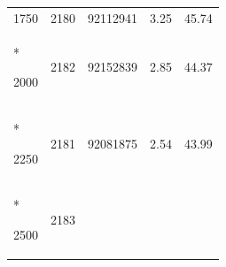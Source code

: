 \documentclass[
  12pt,
  oneside,
  openany]{book}
\begin{document}
\begin{appendices}
\begin{singlespace}
\begin{longtable}[]{@{}lllll@{}}
\begin{minipage}[t]{0.16\columnwidth}
1750\strut
\end{minipage} & \begin{minipage}[t]{0.09\columnwidth}\raggedright
2180\strut
\end{minipage} & \begin{minipage}[t]{0.18\columnwidth}\raggedright
92112941\strut
\end{minipage} & \begin{minipage}[t]{0.24\columnwidth}\raggedright
3.25\strut
\end{minipage} & \begin{minipage}[t]{0.18\columnwidth}\raggedright
45.74\strut
\end{minipage}\tabularnewline*
\begin{minipage}[t]{0.16\columnwidth}\raggedright
2000\strut
\end{minipage} & \begin{minipage}[t]{0.09\columnwidth}\raggedright
2182\strut
\end{minipage} & \begin{minipage}[t]{0.18\columnwidth}\raggedright
92152839\strut
\end{minipage} & \begin{minipage}[t]{0.24\columnwidth}\raggedright
2.85\strut
\end{minipage} & \begin{minipage}[t]{0.18\columnwidth}\raggedright
44.37\strut
\end{minipage}\tabularnewline*
\begin{minipage}[t]{0.16\columnwidth}\raggedright
2250\strut
\end{minipage} & \begin{minipage}[t]{0.09\columnwidth}\raggedright
2181\strut
\end{minipage} & \begin{minipage}[t]{0.18\columnwidth}\raggedright
92081875\strut
\end{minipage} & \begin{minipage}[t]{0.24\columnwidth}\raggedright
2.54\strut
\end{minipage} & \begin{minipage}[t]{0.18\columnwidth}\raggedright
43.99\strut
\end{minipage}\tabularnewline*
\begin{minipage}[t]{0.16\columnwidth}\raggedright
2500\strut
\end{minipage} & \begin{minipage}[t]{0.09\columnwidth}\raggedright
2183\strut
\end{minipage} & \begin{minipage}[t]{0.18\columnwidth}\raggedright

\end{minipage}
\end{longtable}
\end{singlespace}
\end{appendices}
\end{document}
